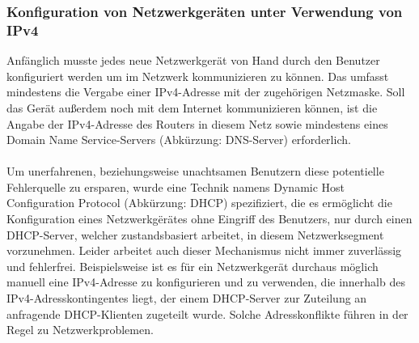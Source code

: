 \documentclass[a4paper,12pt]{scrartcl}
\begin{document}
\subsubsection{Konfiguration von Netzwerkger\"aten  unter Verwendung von IPv4}

Anf\"anglich musste jedes neue Netzwerkger\"at von Hand durch den Benutzer konfiguriert werden um im Netzwerk kommunizieren zu k\"onnen. Das umfasst mindestens die Vergabe einer IPv4-Adresse mit der zugeh\"origen Netzmaske. Soll das Ger\"at au\ss{}erdem noch mit dem Internet kommunizieren k\"onnen, ist die Angabe der IPv4-Adresse des Routers in diesem Netz sowie mindestens eines Domain Name Service-Servers (Abk\"urzung: DNS-Server) erforderlich.\\
\\
Um unerfahrenen, beziehungsweise unachtsamen Benutzern diese potentielle Fehlerquelle zu ersparen, wurde eine Technik namens Dynamic Host Configuration Protocol (Abk\"urzung: DHCP) \cite[RFC2131]{RFC2131} spezifiziert, die es erm\"oglicht die Konfiguration eines Netzwerkg\"er\"ates ohne Eingriff des Benutzers, nur durch einen DHCP-Server, welcher zustandsbasiert arbeitet,  in diesem Netzwerksegment vorzunehmen. Leider arbeitet auch dieser Mechanismus nicht immer zuverl\"assig und fehlerfrei. Beispielsweise ist es f\"ur ein Netzwerkger\"at durchaus m\"oglich manuell eine IPv4-Adresse zu konfigurieren und zu verwenden, die innerhalb des IPv4-Adresskontingentes liegt, der einem DHCP-Server zur Zuteilung an anfragende DHCP-Klienten zugeteilt wurde. Solche Adresskonflikte f\"uhren in der Regel zu Netzwerkproblemen.
\end{document}
